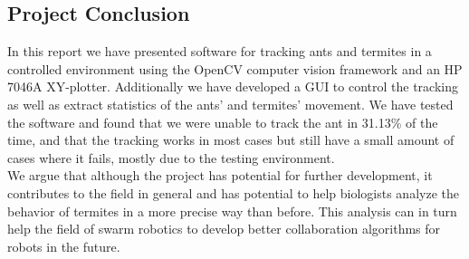 
\subsection{Project Conclusion}

In this report we have presented software for tracking ants and termites in a controlled environment using the OpenCV computer vision framework and an HP 7046A XY-plotter. Additionally we have developed a GUI to control the tracking as well as extract statistics of the ants' and termites' movement. We have tested the software and found that we were unable to track the ant in 31.13\% of the time, and that the tracking works in most cases but still have a small amount of cases where it fails, mostly due to the testing environment. \\

We argue that although the project has potential for further development, it contributes to the field in general and has potential to help biologists analyze the behavior of termites in a more precise way than before. This analysis can in turn help the field of swarm robotics to develop better collaboration algorithms for robots in the future.